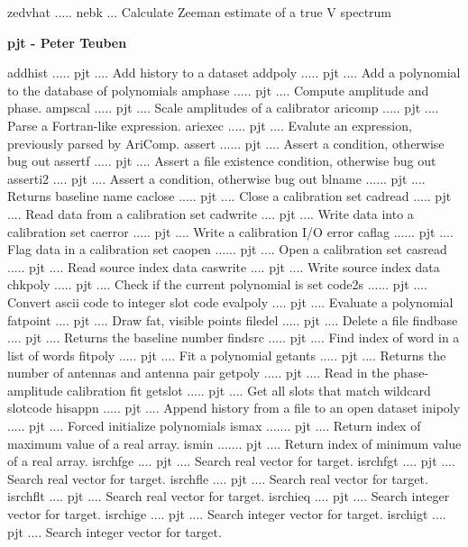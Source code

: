 {\eightpoint\begintt
zedvhat ..... nebk ... Calculate Zeeman estimate of a true V spectrum 
\endtt}
\par\centerline {\bf pjt - Peter Teuben}
{\eightpoint\begintt
addhist ..... pjt .... Add history to a dataset 
addpoly ..... pjt .... Add a polynomial to the database of polynomials 
amphase ..... pjt .... Compute amplitude and phase. 
ampscal ..... pjt .... Scale amplitudes of a calibrator 
aricomp ..... pjt .... Parse a Fortran-like expression. 
\endtt}
{\eightpoint\begintt
ariexec ..... pjt .... Evalute an expression, previously parsed by AriComp. 
assert ...... pjt .... Assert a condition, otherwise bug out 
assertf ..... pjt .... Assert a file existence condition, otherwise bug out 
asserti2 .... pjt .... Assert a condition, otherwise bug out 
blname ...... pjt .... Returns baseline name 
\endtt}
{\eightpoint\begintt
caclose ..... pjt .... Close a calibration set 
cadread ..... pjt .... Read data from a calibration set 
cadwrite .... pjt .... Write data into a calibration set 
caerror ..... pjt .... Write a calibration I/O error 
caflag ...... pjt .... Flag data in a calibration set 
\endtt}
{\eightpoint\begintt
caopen ...... pjt .... Open a calibration set 
casread ..... pjt .... Read source index data 
caswrite .... pjt .... Write source index data 
chkpoly ..... pjt .... Check if the current polynomial is set 
code2s ...... pjt .... Convert ascii code to integer slot code 
\endtt}
{\eightpoint\begintt
evalpoly .... pjt .... Evaluate a polynomial 
fatpoint .... pjt .... Draw fat, visible points 
filedel ..... pjt .... Delete a file 
findbase .... pjt .... Returns the baseline number 
findsrc ..... pjt .... Find index of word in a list of words 
\endtt}
{\eightpoint\begintt
fitpoly ..... pjt .... Fit a polynomial 
getants ..... pjt .... Returns the number of antennas and antenna pair 
getpoly ..... pjt .... Read in the phase-amplitude calibration fit 
getslot ..... pjt .... Get all slots that match wildcard slotcode 
hisappn ..... pjt .... Append history from a file to an open dataset 
\endtt}
{\eightpoint\begintt
inipoly ..... pjt .... Forced initialize polynomials 
ismax ....... pjt .... Return index of maximum value of a real array. 
ismin ....... pjt .... Return index of minimum value of a real array. 
isrchfge .... pjt .... Search real vector for target. 
isrchfgt .... pjt .... Search real vector for target. 
\endtt}
{\eightpoint\begintt
isrchfle .... pjt .... Search real vector for target. 
isrchflt .... pjt .... Search real vector for target. 
isrchieq .... pjt .... Search integer vector for target. 
isrchige .... pjt .... Search integer vector for target. 
isrchigt .... pjt .... Search integer vector for target. 
\endtt}
